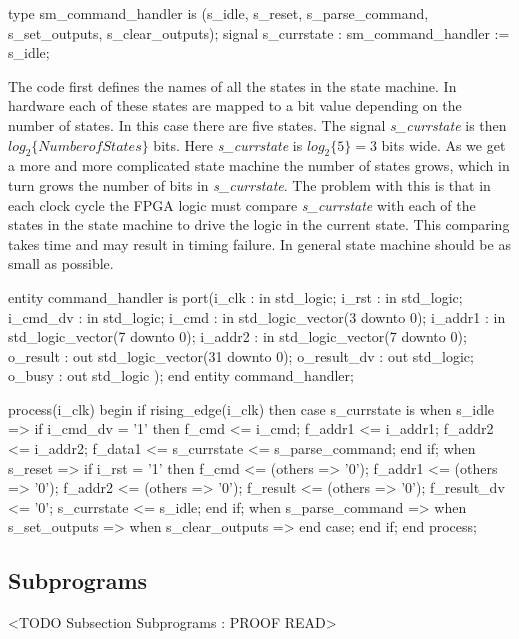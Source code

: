 \begin{VHDLlisting}[tabsize=8]
type sm_command_handler is (s_idle, s_reset, s_parse_command, s_set_outputs, s_clear_outputs);
signal s_currstate : sm_command_handler := s_idle;
\end{VHDLlisting}

The code first defines the names of all the states in the state machine. In hardware each of these states are mapped to a bit value depending on the number of states. In this case there are five states. The signal \emph{s\_currstate} is then $log_2\{{Number of States}\}$ bits. Here \emph{s\_currstate} is $log_2\{5\}=3$ bits wide. As we get a more and more complicated state machine the number of states grows, which in turn grows the number of bits in \emph{s\_currstate}. The problem with this is that in each clock cycle the \ac{FPGA} logic must compare \emph{s\_currstate} with each of the states in the state machine to drive the logic in the current state. This comparing takes time and may result in timing failure. In general state machine should be as small as possible.

\begin{VHDLlisting}[tabsize=8]
entity command_handler is
port(i_clk       : in    std_logic;
	 i_rst       : in    std_logic;
	 i_cmd_dv    : in    std_logic;
	 i_cmd       : in    std_logic_vector(3 downto 0);
	 i_addr1     : in    std_logic_vector(7 downto 0);
	 i_addr2     : in    std_logic_vector(7 downto 0);
	 o_result    :   out std_logic_vector(31 downto 0);
	 o_result_dv :   out std_logic;
	 o_busy      :   out std_logic
);
end entity command_handler;
\end{VHDLlisting}


\begin{VHDLlisting}[tabsize=8]
process(i_clk)
begin
	if rising_edge(i_clk) then
		case s_currstate is
			when s_idle => 
				if i_cmd_dv = '1' then
					f_cmd    <= i_cmd;
					f_addr1  <= i_addr1;
					f_addr2  <= i_addr2;
					f_data1  <= 
					s_currstate <= s_parse_command;
				end if;
			when s_reset => 
				if i_rst = '1' then
					f_cmd <= (others => '0');
					f_addr1 <= (others => '0');
					f_addr2 <= (others => '0');
					f_result <= (others => '0');
					f_result_dv <= '0';
					s_currstate <= s_idle;
				end if;
			when s_parse_command => 
			when s_set_outputs => 
			when s_clear_outputs => 
		end case;
	end if;
end process;
\end{VHDLlisting}
 

\subsection{Subprograms}
	<TODO Subsection Subprograms : PROOF READ>

